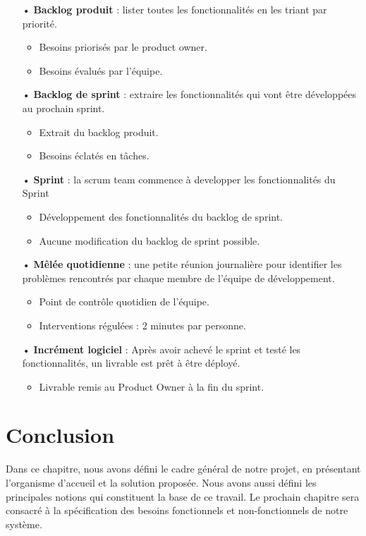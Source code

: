 \begin{itemize}
    \item [•]\textbf{ Backlog produit} : lister toutes les fonctionnalités en les triant par priorité.
    \begin{itemize}
    \item Besoins priorisés par le product owner. 
    \item Besoins évalués par l’équipe.
\end{itemize}
    \item [•] \textbf{Backlog de sprint} : extraire les fonctionnalités qui vont être développées au prochain sprint.
    \begin{itemize}
    \item Extrait du backlog produit.
    \item Besoins éclatés en tâches.
\end{itemize}
    \item [•] \textbf{Sprint} : la scrum team commence à developper les fonctionnalités du Sprint
    \begin{itemize}
    \item Développement des fonctionnalités du backlog de sprint. 
    \item Aucune modification du backlog de sprint possible.
\end{itemize}
    \item [•] \textbf{Mêlée quotidienne} : une petite réunion journalière pour identifier les problèmes rencontrés par chaque membre de l'équipe de développement.
    \begin{itemize}
    \item Point de contrôle quotidien de l’équipe. 
    \item Interventions régulées : 2 minutes par personne.
\end{itemize}
    \item [•] \textbf{Incrément logiciel} : Après avoir achevé le sprint et testé les fonctionnalités, un livrable est prêt à être déployé. 
    \begin{itemize}
    \item Livrable remis au Product Owner à la fin du sprint. 
\end{itemize}
\end{itemize}


\section*{Conclusion}
Dans ce chapitre, nous avons défini le cadre général de notre projet, en présentant l'organisme d'accueil et la solution proposée. Nous avons aussi défini les principales notions qui constituent la base de ce travail. Le prochain chapitre sera consacré à la spécification des besoins fonctionnels et non-fonctionnels de notre système.
